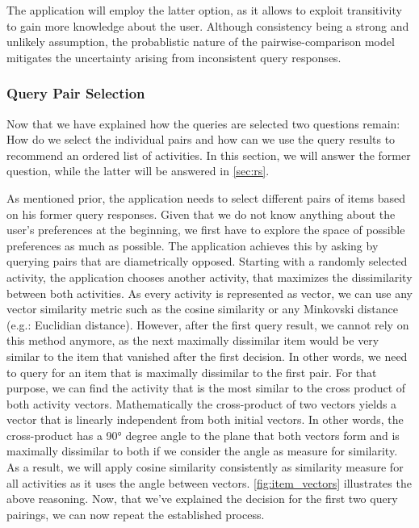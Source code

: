 \documentclass[11pt,a4paper,oneside]{article}
\begin{document}
The application will employ the latter option, as it allows to exploit transitivity to gain more knowledge about the user. Although consistency being a strong and unlikely assumption, the probablistic nature of the pairwise-comparison model mitigates the uncertainty arising from inconsistent query responses.


\subsubsection{Query Pair Selection}
\label{sec:pair}
Now that we have explained how the queries are selected two questions remain: How do we select the individual pairs and how can we use the query results to recommend an ordered list of activities. In this section, we will answer the former question, while the latter will be answered in \autoref{sec:rs}. 

As mentioned prior, the application needs to select different pairs of items based on his former query responses. Given that we do not know anything about the user's preferences at the beginning, we first have to explore the space of possible preferences as much as possible. The application achieves this by asking by querying pairs that are diametrically opposed. Starting with a randomly selected activity, the application chooses another activity, that maximizes the dissimilarity between both activities. As every activity is represented as vector, we can use any vector similarity metric such as the cosine similarity or any Minkovski distance (e.g.: Euclidian distance). However, after the first query result, we cannot rely on this method anymore, as the next maximally dissimilar item would be very similar to the item that vanished after the first decision. In other words, we need to query for an item that is maximally dissimilar to the first pair. For that purpose, we can find the activity that is the most similar to the cross product of both activity vectors. Mathematically the cross-product of two vectors yields a vector that is linearly independent from both initial vectors. In other words, the cross-product has a 90° degree angle to the plane that both vectors form and is maximally dissimilar to both if we consider the angle as measure for similarity. As a result, we will apply cosine similarity consistently as similarity measure for all activities as it uses the angle between vectors. \autoref{fig:item_vectors} illustrates the above reasoning. Now, that we've explained the decision for the first two query pairings, we can now repeat the established process. 
\end{document}
